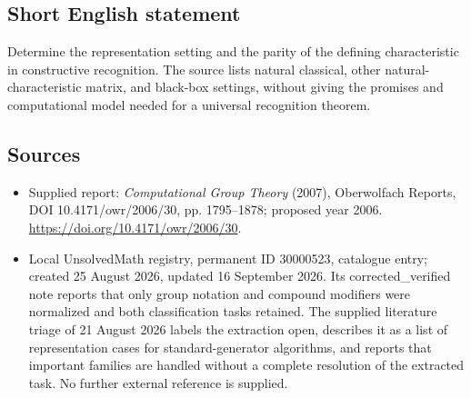 \documentclass[11pt]{article}
\begin{document}
\subsection{Short English statement}
Determine the representation setting and the parity of the defining characteristic in constructive recognition. The source lists natural classical, other natural-characteristic matrix, and black-box settings, without giving the promises and computational model needed for a universal recognition theorem.
\subsection{Sources}
\begin{itemize}
\item Supplied report: \emph{Computational Group Theory} (2007), Oberwolfach Reports, DOI 10.4171/owr/2006/30, pp. 1795--1878; proposed year 2006. \url{https://doi.org/10.4171/owr/2006/30}.
\item Local UnsolvedMath registry, permanent ID 30000523, catalogue entry; created 25 August 2026, updated 16 September 2026. Its corrected\_verified note reports that only group notation and compound modifiers were normalized and both classification tasks retained. The supplied literature triage of 21 August 2026 labels the extraction open, describes it as a list of representation cases for standard-generator algorithms, and reports that important families are handled without a complete resolution of the extracted task. No further external reference is supplied.
\end{itemize}
\end{document}

